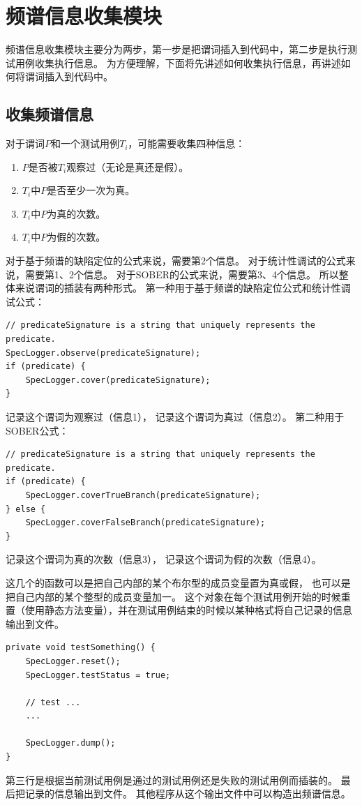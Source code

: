 \section{频谱信息收集模块} 

频谱信息收集模块主要分为两步，第一步是把谓词插入到代码中，第二步是执行测试用例收集执行信息。
为方便理解，下面将先讲述如何收集执行信息，再讲述如何将谓词插入到代码中。

\subsection{收集频谱信息}

对于谓词$P$和一个测试用例$T_i$，可能需要收集四种信息：
\begin{enumerate}
\item $P$是否被$T_i$观察过（无论是真还是假）。
\item $T_i$中$P$是否至少一次为真。
\item $T_i$中$P$为真的次数。
\item $T_i$中$P$为假的次数。
\end{enumerate}

对于基于频谱的缺陷定位的公式来说，需要第2个信息。
对于统计性调试的公式来说，需要第1、2个信息。
对于SOBER的公式来说，需要第3、4个信息。
所以整体来说谓词的插装有两种形式。
第一种用于基于频谱的缺陷定位公式和统计性调试公式：
\lstset{language=Java}
\begin{lstlisting}
// predicateSignature is a string that uniquely represents the predicate.
SpecLogger.observe(predicateSignature);
if (predicate) {
    SpecLogger.cover(predicateSignature);
}
\end{lstlisting}
记录这个谓词为观察过（信息1），
记录这个谓词为真过（信息2）。
第二种用于SOBER公式：
\lstset{language=Java}
\begin{lstlisting}
// predicateSignature is a string that uniquely represents the predicate.
if (predicate) {
    SpecLogger.coverTrueBranch(predicateSignature);
} else {
    SpecLogger.coverFalseBranch(predicateSignature);
}
\end{lstlisting}
记录这个谓词为真的次数（信息3），
记录这个谓词为假的次数（信息4）。

这几个的函数可以是把自己内部的某个布尔型的成员变量置为真或假，
也可以是把自己内部的某个整型的成员变量加一。
这个对象在每个测试用例开始的时候重置（使用静态方法变量），并在测试用例结束的时候以某种格式将自己记录的信息输出到文件。
\lstset{language=Java}
\begin{lstlisting}
private void testSomething() {
    SpecLogger.reset();
    SpecLogger.testStatus = true;

    // test ...
    ...

    SpecLogger.dump();
}
\end{lstlisting}
第三行是根据当前测试用例是通过的测试用例还是失败的测试用例而插装的。
最后把记录的信息输出到文件。
其他程序从这个输出文件中可以构造出频谱信息。

